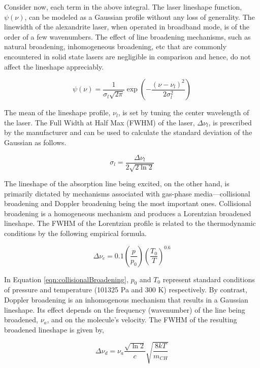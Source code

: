 Consider now, each term in the above integral.
The laser lineshape function, \(\psi(\nu)\), can be modeled as a Gaussian profile without any loss of generality.
The linewidth of the alexandrite laser, when operated in broadband mode, is of the order of a few wavenumbers.
The effect of line broadening mechanisms, such as natural broadening, inhomogeneous broadening, etc that are commonly encountered in solid state lasers are negligible in comparison and hence, do not affect the lineshape appreciably.

\begin{equation}
  \psi(\nu) = \frac{1}{\sigma_l\sqrt{2\pi}} \exp{\left(-\dfrac{(\nu-\nu_l)^2}{2\sigma_l^2}\right)}
  \label{eqn:laserLineShape}
\end{equation}

The mean of the lineshape profile, \(\nu_l\), is set by tuning the center wavelength of the laser.
The Full Width at Half Max (FWHM) of the laser, \(\Delta\nu_l\), is prescribed by the manufacturer and can be used to calculate the standard deviation of the Gaussian as follows.

\begin{equation}
  \sigma_l = \frac{\Delta\nu_l}{2 \sqrt{ 2 \ln{2} } }
\end{equation}

The lineshape of the absorption line being excited, on the other hand, is primarily dictated by mechanisms associated with gas-phase media---collisional broadening and Doppler broadening being the most important ones.
Collisional broadening is a homogeneous mechanism and produces a Lorentzian broadened lineshape.
The FWHM of the Lorentzian profile is related to the thermodynamic conditions by the following empirical formula.

\begin{equation}
  \Delta\nu_c = 0.1 \left(\frac{p}{p_0}\right) \left(\frac{T_0}{T}\right)^{0.6}
  \label{eqn:collisionalBroadening}
\end{equation}

In Equation \ref{eqn:collisionalBroadening}, \(p_0\) and \(T_0\) represent standard conditions of pressure and temperature (101325 Pa and 300 K) respectively.
By contrast, Doppler broadening is an inhomogenous mechanism that results in a Gaussian lineshape.
Its effect depends on the frequency (wavenumber) of the line being broadened, \(\nu_a\), and on the molecule's velocity.
The FWHM of the resulting broadened lineshape is given by,

\begin{equation}
  \Delta\nu_d = \nu_a \frac{\sqrt{ \ln 2 } }{c} \sqrt{\frac{8kT}{m_{CH}}}
  \label{eqn:dopplerBroadening}
\end{equation}

